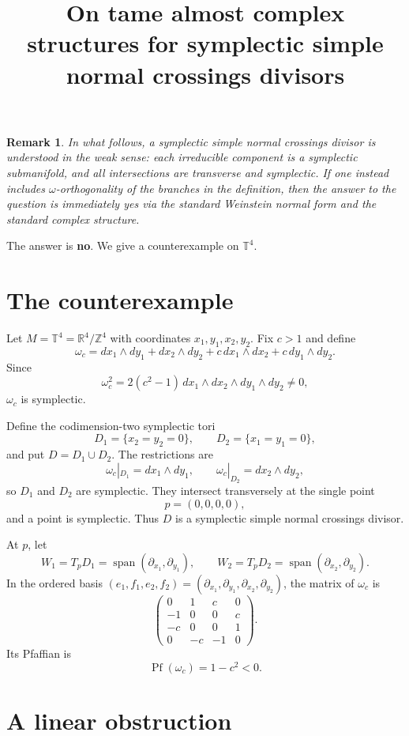 \documentclass{article}
\title{On tame almost complex structures for symplectic simple normal crossings divisors}
\author{}
\date{}
\newtheorem{remark}{Remark}
\begin{document}
\maketitle

\begin{remark}
In what follows, a \emph{symplectic simple normal crossings divisor} is understood in the weak sense: each irreducible component is a symplectic submanifold, and all intersections are transverse and symplectic. If one instead includes $\omega$-orthogonality of the branches in the definition, then the answer to the question is immediately yes via the standard Weinstein normal form and the standard complex structure.
\end{remark}

\noindent
The answer is \textbf{no}. We give a counterexample on $\mathbb{T}^4$.

\section{The counterexample}

Let $M=\mathbb{T}^4=\mathbb{R}^4/\mathbb{Z}^4$ with coordinates
$x_1,y_1,x_2,y_2$. Fix $c>1$ and define
\[
\omega_c=
dx_1\wedge dy_1+dx_2\wedge dy_2
+c\,dx_1\wedge dx_2+c\,dy_1\wedge dy_2.
\]
Since
\[
\omega_c^2
=
2(c^2-1)\,dx_1\wedge dx_2\wedge dy_1\wedge dy_2
\neq 0,
\]
$\omega_c$ is symplectic.

Define the codimension-two symplectic tori
\[
D_1=\{x_2=y_2=0\},\qquad D_2=\{x_1=y_1=0\},
\]
and put $D=D_1\cup D_2$. The restrictions are
\[
\omega_c|_{D_1}=dx_1\wedge dy_1,\qquad
\omega_c|_{D_2}=dx_2\wedge dy_2,
\]
so $D_1$ and $D_2$ are symplectic. They intersect transversely at the single point
\[
p=(0,0,0,0),
\]
and a point is symplectic. Thus $D$ is a symplectic simple normal crossings divisor.

At $p$, let
\[
W_1=T_pD_1=\operatorname{span}(\partial_{x_1},\partial_{y_1}),
\qquad
W_2=T_pD_2=\operatorname{span}(\partial_{x_2},\partial_{y_2}).
\]
In the ordered basis
$(e_1,f_1,e_2,f_2)=(\partial_{x_1},\partial_{y_1},\partial_{x_2},\partial_{y_2})$,
the matrix of $\omega_c$ is
\[
\begin{pmatrix}
0&1&c&0\\
-1&0&0&c\\
-c&0&0&1\\
0&-c&-1&0
\end{pmatrix}.
\]
Its Pfaffian is
\[
\operatorname{Pf}(\omega_c)=1-c^2<0.
\]

\section{A linear obstruction}
\end{document}
